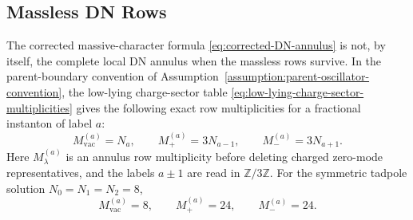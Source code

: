 \documentclass[11pt]{article}
\newcommand{\Z}{\mathbb{Z}}
\newcommand{\vac}{\mathrm{vac}}
\begin{document}
\subsection{Massless DN Rows}

The corrected massive-character formula \eqref{eq:corrected-DN-annulus} is not, by itself, the
complete local DN annulus when the massless rows survive. In the parent-boundary convention of
Assumption~\ref{assumption:parent-oscillator-convention}, the low-lying charge-sector table
\eqref{eq:low-lying-charge-sector-multiplicities} gives the following exact row multiplicities
for a fractional instanton of label \(a\):
\begin{equation}
  M_{\vac}^{(a)}=N_a,
  \qquad
  M_{+}^{(a)}=3N_{a-1},
  \qquad
  M_{-}^{(a)}=3N_{a+1}.
  \label{eq:massless-row-annulus-multiplicities}
\end{equation}
Here \(M_{\lambda}^{(a)}\) is an annulus row multiplicity before deleting charged
zero-mode representatives, and the labels \(a\pm1\) are read in \(\Z/3\Z\). For
the symmetric tadpole solution \(N_0=N_1=N_2=8\),
\begin{equation}
  M_{\vac}^{(a)}=8,
  \qquad
  M_{+}^{(a)}=24,
  \qquad
  M_{-}^{(a)}=24.
  \label{eq:symmetric-massless-row-annulus-multiplicities}
\end{equation}
\end{document}
